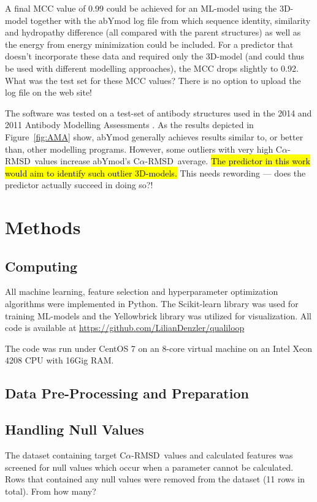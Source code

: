 \documentclass[12pt]{article}
\newcommand{\carmsd}{\mbox{C$\alpha$-RMSD}}
\newcommand{\lilian}[1]{ {\color{red}{\bfseries Lilian:} #1}}
\newcommand{\highlight}[1]{\hl{#1}}
\begin{document}
A final MCC value of 0.99 could be achieved for an ML-model using the
3D-model together with the abYmod log file from which sequence
identity, similarity and hydropathy difference (all compared with the
parent structures) as well as the energy from energy minimization
could be included. For a predictor that doesn't incorporate these data
and required only the 3D-model (and could thus be used with different
modelling approaches), the MCC drops slightly to 0.92.
\lilian{What was the test set for these MCC values?}
\lilian{There is no option to upload the log file on the web site!}


The software
was tested on a test-set of antibody structures used in the 2014 and
2011 Antibody Modelling Assessments
\cite{Almagro2011,Almagro2014}. As the results depicted in
Figure~\ref{fig:AMA} show, abYmod generally achieves results similar to, or better than,
other modelling programs. However, some outliers with very high \carmsd\
values increase abYmod's \carmsd\ average. \highlight{The predictor in this work
  would aim to identify such outlier 3D-models.} \lilian{This needs rewording ---
  does the predictor actually succeed in doing so?!} 

 
\section{Methods}

\subsection{Computing}
All machine learning, feature selection and hyperparameter
optimization algorithms were implemented in Python. The Scikit-learn
library was used for training ML-models and the
Yellowbrick\cite{Bengfort2021} library was utilized for
visualization. All code is available at
\url{https://github.com/LilianDenzler/qualiloop}

The code was run under CentOS 7 on an 8-core virtual machine on an
Intel Xeon 4208 CPU with 16Gig RAM.

\subsection{Data Pre-Processing and Preparation}

\subsection{Handling Null Values}
The dataset containing target
\carmsd\ values and calculated features was screened for null
values which occur when a parameter cannot be calculated.
Rows that contained any null values were
removed from the dataset (11 rows in total). \lilian{From how many?}
\end{document}
